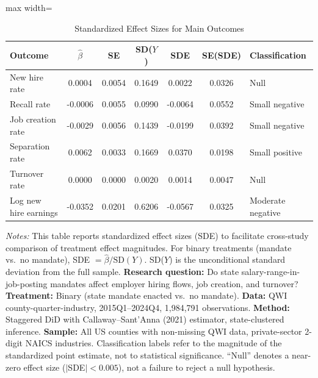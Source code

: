 \begin{table}[H]
\centering
\caption{Standardized Effect Sizes for Main Outcomes}
\label{tab:sde}
\begin{adjustbox}{max width=\textwidth}
\begin{tabular}{lcccccl}
\toprule
Outcome & $\hat{\beta}$ & SE & SD($Y$) & SDE & SE(SDE) & Classification \\
\midrule
New hire rate & 0.0004 & 0.0054 & 0.1649 & 0.0022 & 0.0326 & Null \\
Recall rate & -0.0006 & 0.0055 & 0.0990 & -0.0064 & 0.0552 & Small negative \\
Job creation rate & -0.0029 & 0.0056 & 0.1439 & -0.0199 & 0.0392 & Small negative \\
Separation rate & 0.0062 & 0.0033 & 0.1669 & 0.0370 & 0.0198 & Small positive \\
Turnover rate & 0.0000 & 0.0000 & 0.0020 & 0.0014 & 0.0047 & Null \\
Log new hire earnings & -0.0352 & 0.0201 & 0.6206 & -0.0567 & 0.0325 & Moderate negative \\
\bottomrule
\end{tabular}
\end{adjustbox}
\par\vspace{0.3em}
{\footnotesize \emph{Notes:} This table reports standardized effect sizes (SDE) to facilitate cross-study comparison of treatment effect magnitudes. For binary treatments (mandate vs.\ no mandate), SDE $= \hat{\beta} / \text{SD}(Y)$. SD($Y$) is the unconditional standard deviation from the full sample. \textbf{Research question:} Do state salary-range-in-job-posting mandates affect employer hiring flows, job creation, and turnover? \textbf{Treatment:} Binary (state mandate enacted vs.\ no mandate). \textbf{Data:} QWI county-quarter-industry, 2015Q1--2024Q4, 1,984,791 observations. \textbf{Method:} Staggered DiD with Callaway--Sant'Anna (2021) estimator, state-clustered inference. \textbf{Sample:} All US counties with non-missing QWI data, private-sector 2-digit NAICS industries. Classification labels refer to the magnitude of the standardized point estimate, not to statistical significance. ``Null'' denotes a near-zero effect size ($|$SDE$| < 0.005$), not a failure to reject a null hypothesis.}
\end{table}
